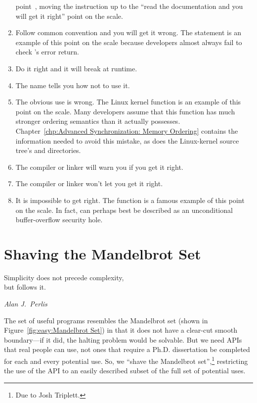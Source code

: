 \begin{enumerate}
	point~\cite{Compaq01,WilliamPugh2000Gharachorloo},
	moving the  instruction up to the
	``read the documentation and you will get it right'' point on
	the scale.
\item	Follow common convention and you will get it wrong.
	The  statement is an example of this point on the
	scale because
	developers almost always fail to check 's error return.
\item	Do it right and it will break at runtime.
\item	The name tells you how not to use it.
\item	The obvious use is wrong.
	The Linux kernel  function is an example of
	this point on the scale.
	Many developers assume that this function has much
	stronger ordering semantics than it actually possesses.
	Chapter~\ref{chp:Advanced Synchronization: Memory Ordering} contains the
	information needed to avoid this mistake, as does the
	Linux-kernel source tree's  and
	 directories.
\item	The compiler or linker will warn you if you get it right.
\item	The compiler or linker won't let you get it right.
\item	It is impossible to get right.
	The  function is a famous example of this point on
	the scale.
	In fact,  can perhaps best be described as
	an unconditional buffer-overflow security hole.
\end{enumerate}

\section{Shaving the Mandelbrot Set}
\label{sec:easy:Shaving the Mandelbrot Set}
%
\epigraph{Simplicity does not precede complexity, \\ but follows it.}
	 {\emph{Alan J.~Perlis}}

The set of useful programs resembles the Mandelbrot set
(shown in Figure~\ref{fig:easy:Mandelbrot Set})
in that it does
not have a clear-cut smooth boundary---if it did, the halting problem
would be solvable.
But we need APIs that real people can use, not ones that require a
Ph.D. dissertation be completed for each and every potential use.
So, we ``shave the Mandelbrot set'',\footnote{
	Due to Josh Triplett.}
restricting the use of the
API to an easily described subset of the full set of potential uses.

